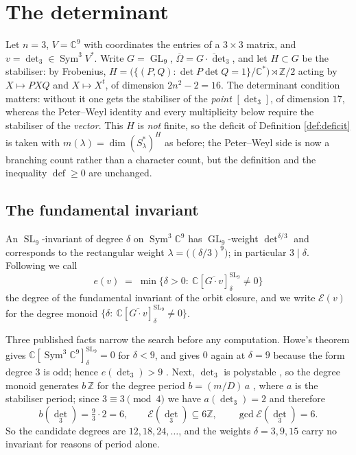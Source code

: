 \documentclass[11pt,reqno]{amsart}
\theoremstyle{plain}
\theoremstyle{definition}
\DeclareMathOperator{\GL}{GL}
\DeclareMathOperator{\SL}{SL}
\DeclareMathOperator{\Sym}{Sym}
\DeclareMathOperator{\dfc}{def}
\newcommand{\cO}{\overline{\Omega}}
\newcommand{\bC}{\mathbb{C}}
\newcommand{\bZ}{\mathbb{Z}}
\begin{document}
\section{The determinant}\label{sec:det}

Let $n=3$, $V=\bC^{9}$ with coordinates the entries of a $3\times3$ matrix, and
$v=\det_3\in \Sym^{3}V^{*}$.  Write $G=\GL_9$, $\cO=\overline{G\cdot\det_3}$,
and let $H\subset G$ be the stabiliser: by Frobenius,
$H=\big(\{(P,Q):\det P\det Q=1\}/\bC^{*}\big)\rtimes\bZ/2$ acting by
$X\mapsto PXQ$ and $X\mapsto X^{t}$, of dimension $2n^{2}-2=16$.  The
determinant condition matters: without it one gets the stabiliser of the
\emph{point} $[\det_3]$, of dimension $17$, whereas the Peter--Weyl identity
and every multiplicity below require the stabiliser of the \emph{vector}.  This $H$ is
\emph{not} finite, so the deficit of Definition \ref{def:deficit} is taken with
$m(\lambda)=\dim(S_\lambda^{*})^{H}$ as before; the Peter--Weyl side is now a
branching count rather than a character count, but the definition and the
inequality $\dfc\ge0$ are unchanged.

\subsection*{The fundamental invariant}
An $\SL_9$-invariant of degree $\delta$ on $\Sym^{3}\bC^{9}$ has $\GL_9$-weight
$\det^{\delta/3}$ and corresponds to the rectangular weight
$\lambda=\big((\delta/3)^{9}\big)$; in particular $3\mid\delta$.  Following
\cite{BI} we call
\[
  e(v)\;=\;\min\{\delta>0:\ \bC[\overline{G\cdot v}]^{\SL_9}_\delta\neq0\}
\]
the degree of the fundamental invariant of the orbit closure, and we write
$\mathcal E(v)$ for the degree monoid $\{\delta:\ \bC[\overline{G\cdot
v}]^{\SL_9}_\delta\neq0\}$.

Three published facts narrow the search before any computation.  Howe's theorem
\cite[Thm.~3.14]{BI} gives $\bC[\Sym^{3}\bC^{9}]^{\SL_9}_\delta=0$ for
$\delta<9$, and gives $0$ again at $\delta=9$ because the form degree $3$ is
odd; hence $e(\det_3)>9$ \cite[Thm.~3.15]{BI}.  Next, $\det_3$ is polystable
\cite[Cor.~2.9]{BI}, so the degree monoid generates $b\,\bZ$ for the degree
period $b=(m/D)\,a$ \cite[Thm.~3.4]{BI}, where $a$ is the stabiliser period;
since $3\equiv3\pmod 4$ we have $a(\det_3)=2$ \cite[Thm.~2.5]{BI} and
therefore
\[
  b(\det_3)=\tfrac{9}{3}\cdot 2=6,
  \qquad
  \mathcal E(\det_3)\subseteq 6\bZ,
  \qquad
  \gcd\mathcal E(\det_3)=6 .
\]
So the candidate degrees are $12,18,24,\dots$, and the weights $\delta=3,9,15$
carry no invariant for reasons of period alone.
\end{document}
